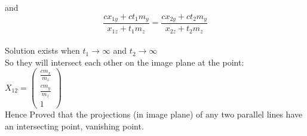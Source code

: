 \documentclass{article}
\begin{document}
	and
	\begin{equation}\frac{cx_{1y}+ct_1m_y}{x_{1z}+t_1m_z} = \frac{cx_{2y}+ct_2m_y}{x_{2z}+t_2m_z}\end{equation}
	\\
	Solution exists when \begin{math}t_1\to\infty\end{math} and \begin{math}t_2\to\infty\end{math}
	\\
	So they will intersect each other on the image plane at the point:
	\\
	\begin{math}X_{12} = \begin{pmatrix}\frac{cm_x}{m_z}\\\frac{cm_y}{m_z}\\1\end{pmatrix}\end{math}
	\\
	Hence Proved that the projections (in image plane) of any two parallel lines have an intersecting point, vanishing point.
	\\
	\\
	\\
\end{document}
